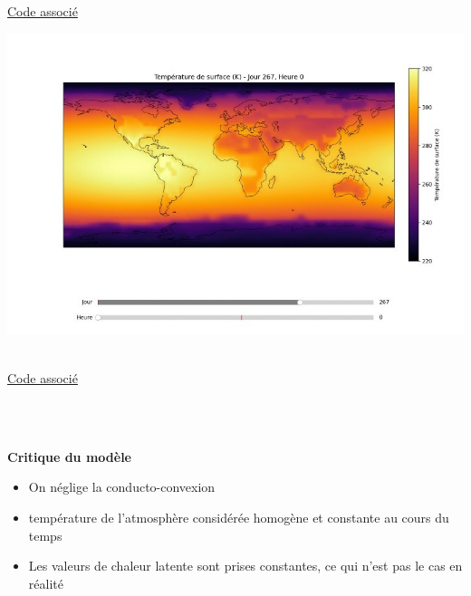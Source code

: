 \documentclass[a4paper,12pt]{article}
\begin{document}
\href{https://github.com/pierrelouis-cmrt/CREPES/blob/main/modele4/code/modele_sphere_haute_res.py}{Code associé}  

  \begin{center}
  \includegraphics[width=1\linewidth]{modele4/figures/plan2}
  
  \end{center}
  \\ 
\href{https://github.com/pierrelouis-cmrt/CREPES/blob/main/modele4/code/modele_planisphere_haute_res.py}{Code associé}


\\
\vspace{0,5cm}
\\

\textbf{Critique du modèle}

\begin{itemize}
    \item On néglige la conducto-convexion
    \item température de l'atmosphère considérée homogène et constante au cours du temps
    \item Les valeurs de chaleur latente sont prises constantes, ce qui n'est pas le cas en réalité
\end{itemize}
\end{document}
